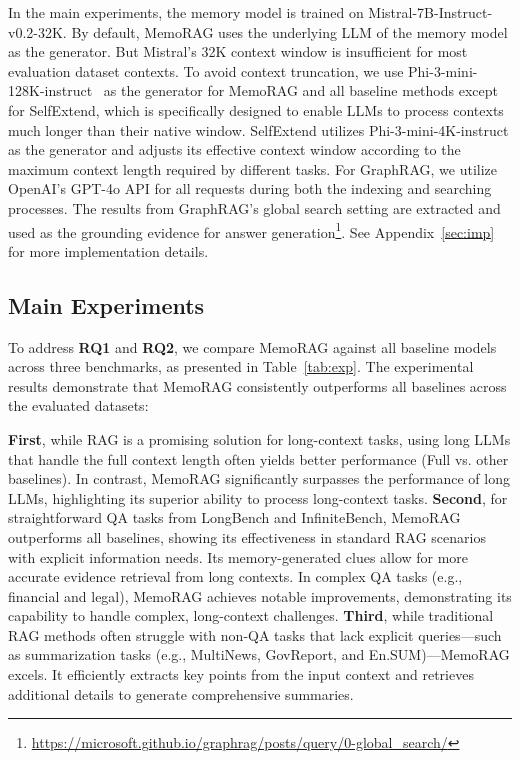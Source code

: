 \documentclass[sigconf]{acmart}
\begin{document}
In the main experiments, the memory model is trained on Mistral-7B-Instruct-v0.2-32K. By default, MemoRAG uses the underlying LLM of the memory model as the generator. But Mistral’s 32K context window is insufficient for most evaluation dataset contexts. To avoid context truncation, we use Phi-3-mini-128K-instruct~\cite{abdin2024phi3} as the generator for MemoRAG and all baseline methods except for SelfExtend, which is specifically designed to enable LLMs to process contexts much longer than their native window. SelfExtend utilizes Phi-3-mini-4K-instruct as the generator and adjusts its effective context window according to the maximum context length required by different tasks.  For GraphRAG, we utilize OpenAI's GPT-4o API for all requests during both the indexing and searching processes. The results from GraphRAG's global search setting are extracted and used as the grounding evidence for answer generation\footnote{\url{https://microsoft.github.io/graphrag/posts/query/0-global\_search/}}. See Appendix~\ref{sec:imp} for more implementation details.

\subsection{Main Experiments}
To address \textbf{RQ1} and \textbf{RQ2}, we compare MemoRAG against all baseline models across three benchmarks, as presented in Table~\ref{tab:exp}. The experimental results demonstrate that MemoRAG consistently outperforms all baselines across the evaluated datasets:

\textbf{First}, while RAG is a promising solution for long-context tasks, using long LLMs that handle the full context length often yields better performance (Full vs. other baselines). In contrast, MemoRAG significantly surpasses the performance of long LLMs, highlighting its superior ability to process long-context tasks.
\textbf{Second}, for straightforward QA tasks from LongBench and InfiniteBench, MemoRAG outperforms all baselines, showing its effectiveness in standard RAG scenarios with explicit information needs. Its memory-generated clues allow for more accurate evidence retrieval from long contexts. In complex QA tasks (e.g., financial and legal), MemoRAG achieves notable improvements, demonstrating its capability to handle complex, long-context challenges.
\textbf{Third}, while traditional RAG methods often struggle with non-QA tasks that lack explicit queries—such as summarization tasks (e.g., MultiNews, GovReport, and En.SUM)—MemoRAG excels. It efficiently extracts key points from the input context and retrieves additional details to generate comprehensive summaries.
\end{document}
